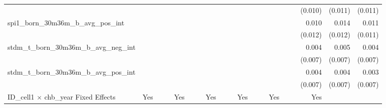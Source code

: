 \begin{tabular}{lrrrrrrrrrrrrrrrrrr}
                                            &              &              &              &              &              &              &              &              &               &              &              &               &              &              &               &      (0.010) &      (0.011) &       (0.011) \\ 
spi1\_born\_30m36m\_b\_avg\_pos\_int        &              &              &              &              &              &              &              &              &               &              &              &               &              &              &               &        0.010 &        0.014 &         0.011 \\ 
                                            &              &              &              &              &              &              &              &              &               &              &              &               &              &              &               &      (0.012) &      (0.012) &       (0.011) \\ 
stdm\_t\_born\_30m36m\_b\_avg\_neg\_int     &              &              &              &              &              &              &              &              &               &              &              &               &              &              &               &        0.004 &        0.005 &         0.004 \\ 
                                            &              &              &              &              &              &              &              &              &               &              &              &               &              &              &               &      (0.007) &      (0.007) &       (0.007) \\ 
stdm\_t\_born\_30m36m\_b\_avg\_pos\_int     &              &              &              &              &              &              &              &              &               &              &              &               &              &              &               &        0.004 &        0.004 &         0.003 \\ 
                                            &              &              &              &              &              &              &              &              &               &              &              &               &              &              &               &      (0.007) &      (0.007) &       (0.007) \\ 
\midrule
ID\_cell1 $\times$ chb\_year Fixed Effects  &          Yes &              &              &          Yes &              &              &          Yes &              &               &          Yes &              &               &          Yes &              &               &          Yes &              &               \\ 

\end{tabular}
